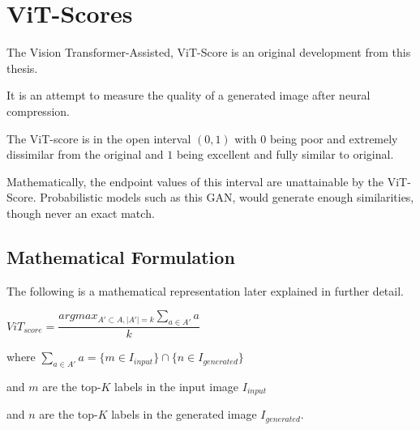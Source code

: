 \section{ViT-Scores}

The Vision Transformer-Assisted, ViT-Score is an original development from this thesis. 

It is an attempt to measure the quality of a generated image after neural compression.

The ViT-score is in the open interval $(0,1)$ with $0$ being poor and extremely dissimilar from
the original and $1$ being excellent and fully similar to original.

Mathematically, the endpoint values of this interval are unattainable by the ViT-Score. 
Probabilistic models such as this GAN, would generate enough similarities, though never an exact match.


\subsection{Mathematical Formulation}

The following is a mathematical representation later explained in further detail.

\vspace{1mm}


\begin{center}
    $ViT_{score} = \displaystyle\dfrac{argmax_{A'\subset A,\lvert A' \rvert = k } \sum_{a \in A'} {a} }{k} $
\end{center}

\vspace{1mm}

\begin{center}
where $\sum_{a \in A'} {a}  = \lbrace{m \in I_{input}}\rbrace \cap \lbrace{n \in I_{generated}}\rbrace$
\end{center}

\vspace{2mm}

and $m$ are the top-$K$ labels in the input image $I_{input}$

and $n$ are the top-$K$ labels in the generated image $I_{generated}$.

\vspace{5pt}

